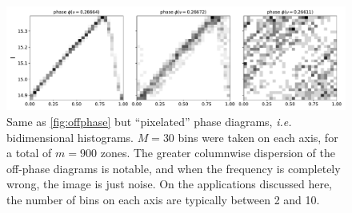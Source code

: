 	\begin{figure}
		\centering
		\includegraphics[width=\textwidth]{img/offhist2d.pdf}
		\caption[Off-frequency phase diagrams: histograms]{
			Same as \autoref{fig:offphase} but \enquote{pixelated} phase diagrams, \textit{i.e.} bidimensional histograms.
			$M=30$ bins were taken on each axis, for a total of $m=900$ zones.
			The greater columnwise dispersion of the off-phase diagrams is notable, 
			and when the frequency is completely wrong, the image is just noise.
			On the applications discussed here, the number of bins on each axis are typically between 2 and 10.
		}
		\label{fig:offhist2d}
	\end{figure}




	
	
	
	
	
	
	
	
	
	
	
	
	
	
	
	
	
	
	
	
	
	
	
	
	
	
	
	
	
	
	
	
	
	